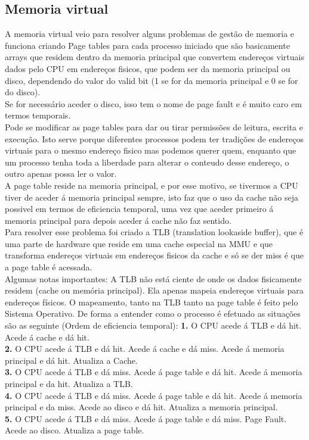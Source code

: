 \documentclass[a4paper, 11pt, onecolumn, oneside]{scrartcl}
\begin{document}
\subsection{Memoria virtual}
A memoria virtual veio para resolver alguns problemas de gestão de memoria e funciona criando Page tables para cada processo iniciado que são basicamente arrays que residem dentro da memoria 
principal que convertem endereços virtuais dados pelo CPU em endereços fisicos, que podem ser da memoria principal ou disco, dependendo do valor do valid bit (1 se for da memoria principal e 
0 se for do disco).\\ 
Se for necessário aceder o disco, isso tem o nome de page fault e é muito caro em termos temporais.\\
Pode se modificar as page tables para dar  ou tirar permissões de leitura, escrita e execução. Isto serve porque diferentes processos podem ter tradições de endereços virtuais para o mesmo 
endereço fisico mas podemos querer quem, enquanto que um processo tenha toda a liberdade para alterar o conteudo desse endereço, o outro apenas possa ler o valor.\\
A page table reside na memoria principal, e por esse motivo, se tivermos a CPU tiver de aceder á memoria principal sempre, isto faz que o uso da cache não seja possivel em termos de eficiencia 
temporal, uma vez que aceder primeiro á memoria principal para depois aceder á cache não faz sentido.\\
Para resolver esse problema foi criado a TLB (translation lookaside buffer), que é uma parte de hardware que reside em uma cache especial na MMU e que transforma 
endereços virtuais em endereços fisicos da cache e só se der miss é que a page table é acessada.\\
Algumas notas importantes: A TLB não está ciente de onde os dados fisicamente residem (cache ou memória principal). Ela apenas mapeia endereços virtuais para endereços físicos.
O mapeamento, tanto na TLB tanto na page table é feito pelo Sistema Operativo.
\newline
De forma a entender como o processo é efetuado as situações são as seguinte (Ordem de eficiencia temporal):
\textbf{1.} O CPU acede á TLB e dá hit. Acede á cache e dá hit.\\
\textbf{2.} O CPU acede á TLB e dá hit. Acede á cache e dá miss. Acede á memoria principal e dá hit. Atualiza a Cache.\\
\textbf{3.} O CPU acede á TLB e dá miss. Acede á page table e dá hit. Acede á memoria principal e da hit. Atualiza a TLB.\\
\textbf{4.} O CPU acede á TLB e dá miss. Acede á page table e dá hit. Acede á memoria principal e da miss. Acede ao disco e dá hit. Atualiza a memoria principal.\\
\textbf{5.} O CPU acede á TLB e dá miss. Acede á page table e dá miss. Page Fault. Acede ao disco. Atualiza a page table.\\
\end{document}
